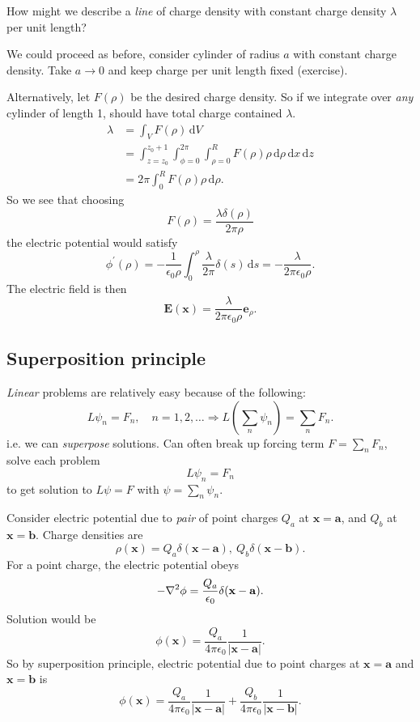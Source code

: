 \begin{example}
    How might we describe a \textit{line} of charge density with constant charge density $ \lambda $ per unit length?

    We could proceed as before, consider cylinder of radius $a$ with constant charge density. Take $a\to 0$ and keep charge per unit length fixed (exercise).

    Alternatively, let $ F(\rho) $ be the desired charge density. So if we integrate over \textit{any} cylinder of length 1, should have total charge contained $ \lambda $.
    \begin{align*}
        \lambda&= \int_{V} F(\rho) \,\mathrm{d}V\\ 
        &= \int_{z=z_0}^{z_0+1} \int_{\phi=0}^{2\pi} \int_{\rho=0}^{R} F(\rho)\rho \,\mathrm{d}\rho \,\mathrm{d}x \,\mathrm{d}z\\ 
        &= 2\pi \int_{0}^{R} F(\rho)\rho \,\mathrm{d}\rho .
    \end{align*}
    So we see that choosing 
    \[
        F(\rho)=\frac{\lambda \delta(\rho)}{2\pi \rho}
    \]
    the electric potential would satisfy
    \[
        \phi^{\prime}(\rho)=-\frac{1}{\epsilon_{0} \rho} \int_{0}^{\rho} \frac{\lambda}{2 \pi} \delta(s) \,\mathrm{d} s=-\frac{\lambda}{2 \pi \epsilon_{0} \rho}.
    \]
    The electric field is then
    \[
        \mathbf{E}(\mathbf{x})=\frac{\lambda}{2 \pi \epsilon_{0} \rho} \mathbf{e}_{\rho}.
    \]
\end{example}

\subsection{Superposition principle}
\textit{Linear} problems are relatively easy because of the following: 
\[
    L \psi_n = F_n,\quad n=1,2,\dots \Longrightarrow 
    L\left( \sum_{n} \psi_n \right) = \sum_{n} F_n.
\]
i.e. we can \textit{superpose} solutions. Can often break up forcing term $ F=\sum_n F_n $, solve each problem 
\[
    L \psi_n=F_n
\]
to get solution to $ L \psi=F $ with $ \psi=\sum_n \psi_n $.

\begin{example}
    Consider electric potential due to \textit{pair} of point charges $ Q_a $ at $ \mathbf{x}=\mathbf{a} $, and $ Q_b $ at $ \mathbf{x}=\mathbf{b} $. Charge densities are
    \[
        \rho(\mathbf{x})=Q_a \delta(\mathbf{x}-\mathbf{a}),\ Q_b \delta(\mathbf{x}-\mathbf{b}).
    \]
    For a point charge, the electric potential obeys 
    \[
        -\laplacian \phi = \frac{Q_a}{\epsilon_0}\delta(\mathbf{x}-\mathbf{a}).
    \]
    Solution would be 
    \[
        \phi(\mathbf{x}) = \frac{Q_a}{4\pi \epsilon_0}\frac{1}{|\mathbf{x}-\mathbf{a}|}.
    \]
    So by superposition principle, electric potential due to point charges at $ \mathbf{x}=\mathbf{a} $ and $ \mathbf{x}=\mathbf{b} $ is 
    \[
        \phi(\mathbf{x})=\frac{Q_a}{4\pi \epsilon_0}\frac{1}{|\mathbf{x}-\mathbf{a}|}+\frac{Q_b}{4\pi \epsilon_0}\frac{1}{|\mathbf{x}-\mathbf{b}|}.
    \]
\end{example}

